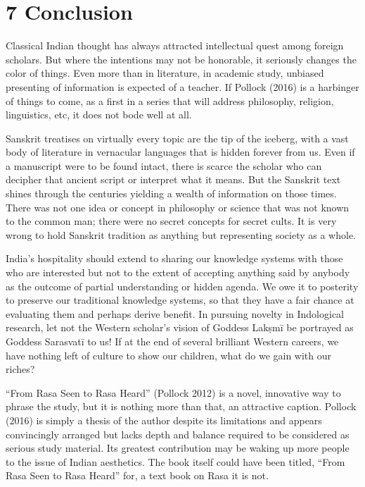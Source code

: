 \section*{7 Conclusion}

Classical Indian thought has always attracted intellectual quest among foreign scholars. But where the intentions may not be honorable, it seriously changes the color of things. Even more than in literature, in academic study, unbiased presenting of information is expected of a teacher. If Pollock (2016) is a harbinger of things to come, as a first in a series that will address philosophy, religion, linguistics, etc, it does not bode well at all.

Sanskrit treatises on virtually every topic are the tip of the iceberg, with a vast body of literature in vernacular languages that is hidden forever from us. Even if a manuscript were to be found intact, there is scarce the scholar who can decipher that ancient script or interpret what it means. But the Sanskrit text shines through the centuries yielding a wealth of information on those times. There was not one idea or concept in philosophy or science that was not known to the common man; there were no secret concepts for secret cults. It is very wrong to hold Sanskrit tradition as anything but representing society as a whole.

India’s hospitality should extend to sharing our knowledge systems with those who are interested but not to the extent of accepting anything said by anybody as the outcome of partial understanding or hidden agenda. We owe it to posterity to preserve our traditional knowledge systems, so that they have a fair chance at evaluating them and perhaps derive benefit. In pursuing novelty in Indological research, let not the Western scholar’s vision of Goddess Lakṣmī be portrayed as Goddess Sarasvatī to us! If at the end of several brilliant Western careers, we have nothing left of culture to show our children, what do we gain with our riches?

“From Rasa Seen to Rasa Heard” (Pollock 2012) is a novel, innovative way to phrase the study, but it is nothing more than that, an attractive caption. Pollock (2016) is simply a thesis of the author despite its limitations and appears convincingly arranged but lacks depth and balance required to be considered as serious study material. Its greatest contribution may be waking up more people to the issue of Indian aesthetics. The book itself could have been titled, “From Rasa Seen to Rasa Heard” for, a text book on Rasa it is not.


